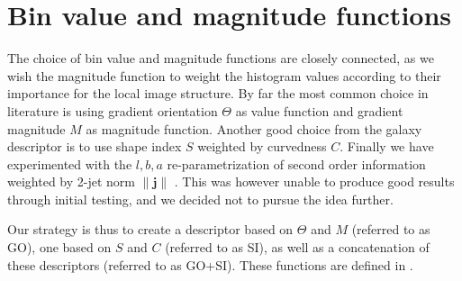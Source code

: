 \documentclass[thesis.tex]{subfiles}
\begin{document}
\section{Bin value and magnitude functions}
\label{sec:valueMagnitudeFunctions}
%
The choice of bin value and magnitude functions are closely connected, as we wish the magnitude function to weight the histogram values according to their importance for the local image structure. By far the most common choice in literature \cite{lowe2004distinctive,ke2004pca,mikolajczyk2005performance,tola2008fast} is using gradient orientation $\Theta$ as value function and gradient magnitude $M$ as magnitude function. Another good choice from the galaxy descriptor \cite{pedersen2013shape} is to use shape index $S$ weighted by curvedness $C$. Finally we have experimented with the $l,b,a$ re-parametrization of second order information weighted by 2-jet norm $\| \mathbf{j} \|$ \citep{griffin2007second}. This was however unable to produce good results through initial testing, and we decided not to pursue the idea further.

Our strategy is thus to create a descriptor based on $\Theta$ and $M$ (referred to as GO), one based on $S$ and $C$ (referred to as SI), as well as a concatenation of these descriptors (referred to as GO+SI). These functions are defined in .
\end{document}
